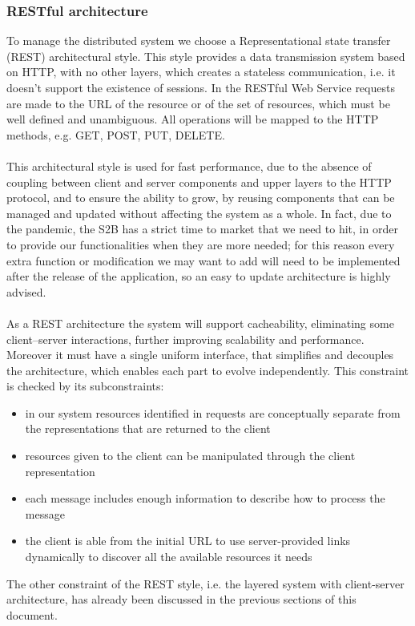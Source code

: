 \subsubsection{RESTful architecture}
To manage the distributed system we choose a Representational state transfer (REST) architectural style. This style provides a data transmission system based on HTTP, with no other layers, which creates a stateless communication, i.e. it doesn't support the existence of sessions. In the RESTful Web Service requests are made to the URL of the resource or of the set of resources, which must be well defined and unambiguous. All operations will be mapped to the HTTP methods, e.g. GET, POST, PUT, DELETE.\\\\ This architectural style is used for fast performance, due to the absence of coupling between client and server components and upper layers to the HTTP protocol, and to ensure the ability to grow, by reusing components that can be managed and updated without affecting the system as a whole. In fact, due to the pandemic, the S2B has a strict time to market that we need to hit, in order to provide our functionalities when they are more needed; for this reason every extra function or modification we may want to add will need to be implemented after the release of the application, so an easy to update architecture is highly advised.\\\\
As a REST architecture the system will support cacheability, eliminating some client–server interactions, further improving scalability and performance.\\
Moreover it must have a single uniform interface, that simplifies and decouples the architecture, which enables each part to evolve independently. This constraint is checked by its subconstraints:
\begin{itemize}
	\item in our system resources identified in requests are conceptually separate from the representations that are returned to the client
	\item resources given to the client can be manipulated through the client representation
	\item each message includes enough information to describe how to process the message
	\item the client is able from the initial URL to use server-provided links dynamically to discover all the available resources it needs
\end{itemize}
The other constraint of the REST style, i.e. the layered system with client-server architecture, has already been discussed in the previous sections of this document. 